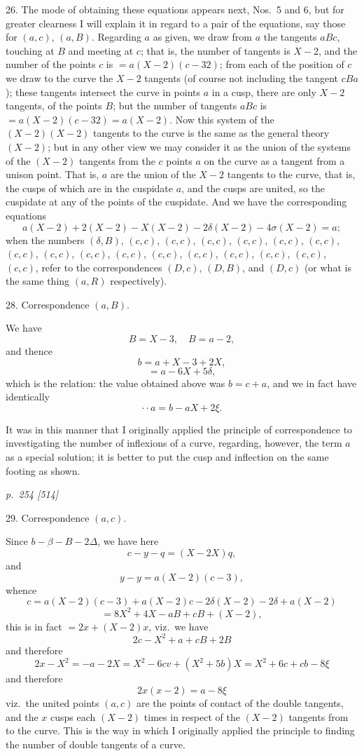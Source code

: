 \documentclass[11pt,a4paper]{book}
\begin{document}
26.  The mode of obtaining these equations appears next, Nos.~5 and 6, but for
greater clearness I will explain it in regard to a pair of the equations, say those for
$(a, c)$, $(a, B)$.  Regarding $a$ as given, we draw from $a$ the tangents $aBc$, touching at
$B$ and meeting at $c$; that is, the number of tangents is $X - 2$, and the
number of the points $c$ is $= a(X - 2)(c - 32)$; from each of the position of $c$ we draw
to the curve the $X - 2$ tangents (of course not including the tangent $cBa$); these
tangents intersect the curve in points $a$ in a cusp, there are only $X - 2$ tangents,
of the points $B$; but the number of tangents $aBc$ is $= a(X - 2)(c - 32) = a(X - 2)$.
Now this system of the $(X - 2)(X - 2)$ tangents to the curve is the same as the general
theory $(X - 2)$; but in any other view we may consider it as the union of the systems
of the $(X - 2)$ tangents from the $c$ points $a$ on the curve as a tangent from a unison
point. That is, $a$ are the union of the $X - 2$ tangents to the curve, that is, the cusps of
which are in the cuspidate $a$, and the cusps are united, so the cuspidate at any of
the points of the cuspidate. And we have the corresponding equations
\[
a(X - 2) + 2(X - 2) - X(X - 2) - 2\delta(X - 2) - 4\sigma(X - 2) = a;
\]
when the numbers $(\delta, B)$, $(c, c)$, $(c, c)$, $(c, c)$, $(c, c)$, $(c, c)$, $(c, c)$, $(c, c)$, $(c, c)$, $(c, c)$, $(c, c)$, $(c, c)$, $(c, c)$, $(c, c)$, $(c, c)$, $(c, c)$, $(c, c)$, refer to the correspondences $(D, c)$,
$(D, B)$, and $(D, c)$ (or what is the same thing $(a, R)$ respectively).

28.  Correspondence $(a, B)$.

We have
\[
B = X - 3, \quad B = a - 2,
\]
and thence
\[
b = a + X - 3 + 2X,
\]
\[
= a - 6X + 5\delta,
\]
which is the relation: the value obtained above was $b = c + a$, and we in fact have
identically
\[
\cdot \cdot a = b - aX + 2\xi.
\]

It was in this manner that I originally applied the principle of correspondence to
investigating the number of inflexions of a curve, regarding, however, the term $a$ as
a special solution; it is better to put the cusp and inflection on the same footing
as shown.

\clearpage

\bigskip
\textit{p.~254 [514]}
\smallskip

29.  Correspondence $(a, c)$.

Since $b - \beta - B - 2\Delta$, we have here
\[
c - y - q = (X - 2X)q,
\]
and
\[
y - y = a(X - 2)(c - 3),
\]
whence
\[
c = a(X - 2)(c - 3) + a(X - 2)c - 2\delta(X - 2) - 2\delta + a(X - 2)
\]
\[
= 8X^2 + 4X - aB + cB + (X - 2),
\]
this is in fact $= 2x + (X - 2)x$, viz.\ we have
\[
2c - X^2 + a + cB + 2B
\]
and therefore
\[
2x - X^2 = -a - 2X = X^2 - 6cv + (X^2 + 5b)X = X^2 + 6c + cb - 8\xi
\]
and therefore
\[
2x(x - 2) = a - 8\xi
\]
viz.\ the united points $(a, c)$ are the points of contact of the double tangents, and
the $x$ cusps each $(X - 2)$ times in respect of the $(X - 2)$ tangents from to the
curve.  This is the way in which I originally applied the principle to finding the
number of double tangents of a curve.
\end{document}

